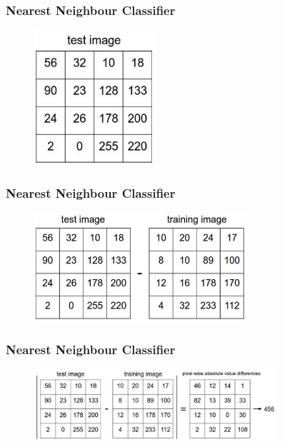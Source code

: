 \begin{frame}
        \frametitle{Nearest Neighbour Classifier}

        \centering
        \begin{figure}
                \includegraphics[width=0.4\textwidth]{Pics/nn1.png}
        \end{figure}

\end{frame}

\begin{frame}
        \frametitle{Nearest Neighbour Classifier}

        \centering
        \begin{figure}
                \includegraphics[width=0.7\textwidth]{Pics/nn2.png}
        \end{figure}

\end{frame}

\begin{frame}
        \frametitle{Nearest Neighbour Classifier}

        \centering
        \begin{figure}
                \includegraphics[width=0.8\textwidth]{Pics/nn3.png}
        \end{figure}

\end{frame}


